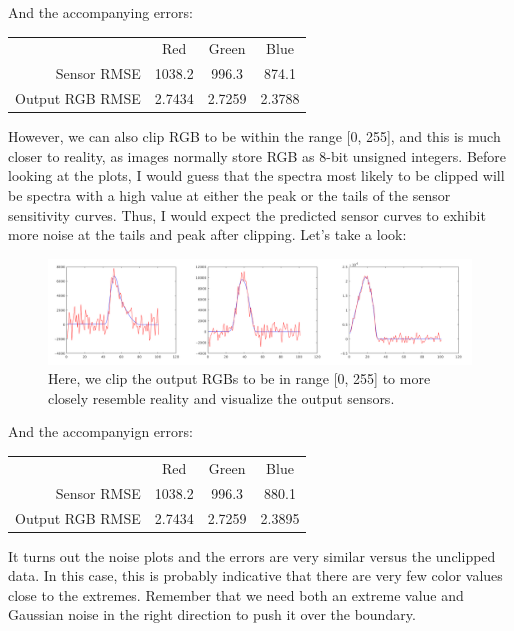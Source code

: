 \documentclass{article}
\begin{document}
And the accompanying errors:

\begin{tabular}{r | c c c}
                    & Red    & Green  & Blue   \\
    Sensor RMSE     & 1038.2 & 996.3  & 874.1  \\
    Output RGB RMSE & 2.7434 & 2.7259 & 2.3788 \\
\end{tabular}

However, we can also clip RGB to be within the range [0, 255], and this is much 
closer to reality, as images normally store RGB as 8-bit unsigned integers. Before 
looking at the plots, I would guess that the spectra most likely to be clipped 
will be spectra with a high value at either the peak or the tails of the sensor 
sensitivity curves. Thus, I would expect the predicted sensor curves to exhibit 
more noise at the tails and peak after clipping. Let's take a look:


\begin{figure}[!ht]
	\centering
	\includegraphics[width=160mm]{figs/sensors_noise_stddev10_clipped_chanall.png}
	\caption{Here, we clip the output RGBs to be in range [0, 255] to more 
        closely resemble reality and visualize the output sensors.}
\end{figure}

And the accompanyign errors:

\begin{tabular}{r | c c c}
                    & Red    & Green  & Blue   \\
    Sensor RMSE     & 1038.2 & 996.3  & 880.1  \\
    Output RGB RMSE & 2.7434 & 2.7259 & 2.3895 \\
\end{tabular}

It turns out the noise plots and the errors are very similar versus the 
unclipped data. In this case, this is probably indicative that there are very 
few color values close to the extremes. Remember that we need both an extreme 
value and Gaussian noise in the right direction to push it over the boundary.
\end{document}
